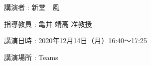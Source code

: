 \documentclass[a4j,10pt,a4paper, fleqn]{jsarticle}\usepackage{stylefile}
\begin{document}
\begin{thebibliography}{9}








\end{thebibliography}
\vspace{-5mm}

\begin{list}{}{ \itemindent=8mm}
	\renewcommand{\makelabel}{\normalsize}
	\item[\quad 講演者\hfill]: 新堂　風 
	\item[\quad 指導教員\hfill]: 亀井 靖高 准教授
	\item[\quad 講演日時\hfill]: 2020年12月14日（月）16:40～17:25
	\item[\quad 講演場所\hfill]: Teams
\end{list}
\end{document}
